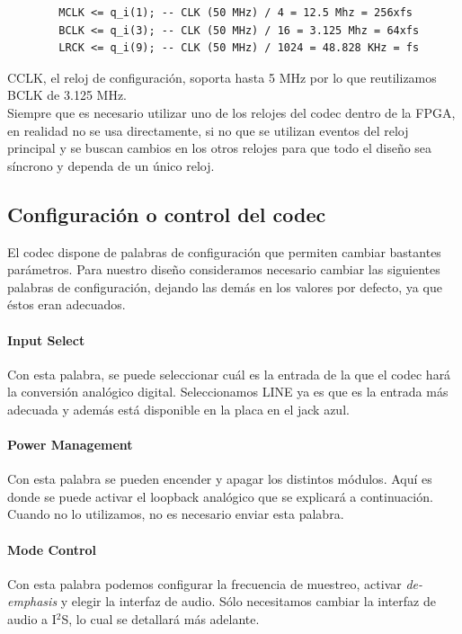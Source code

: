 		\begin{verbatim}
		MCLK <= q_i(1); -- CLK (50 MHz) / 4 = 12.5 Mhz = 256xfs
		BCLK <= q_i(3); -- CLK (50 MHz) / 16 = 3.125 Mhz = 64xfs
		LRCK <= q_i(9); -- CLK (50 MHz) / 1024 = 48.828 KHz = fs
		\end{verbatim} 

CCLK, el reloj de configuración, soporta hasta 5 MHz por lo que reutilizamos BCLK de 3.125 MHz.\\

		Siempre que es necesario utilizar uno de los relojes del codec dentro de la FPGA, en realidad no se usa directamente, si no que se utilizan eventos del reloj principal y se buscan cambios en los otros relojes para que todo el diseño sea síncrono y dependa de un único reloj.






	\subsection{Configuración o control del codec}

		El codec dispone de palabras de configuración que permiten cambiar bastantes parámetros. Para nuestro diseño consideramos necesario cambiar las siguientes palabras de configuración, dejando las demás en los valores por defecto, ya que éstos eran adecuados.\\

		\paragraph{Input Select} 
		Con esta palabra, se puede seleccionar cuál es la entrada de la que el codec hará la conversión analógico digital. Seleccionamos LINE ya es que es la entrada más adecuada y además está disponible en la placa en el jack azul.\\

		\paragraph{Power Management} 
		Con esta palabra se pueden encender y apagar los distintos módulos. Aquí es donde se puede activar el loopback analógico que se explicará a continuación. Cuando no lo utilizamos, no es necesario enviar esta palabra.\\

		\paragraph{Mode Control} 
		Con esta palabra podemos configurar la frecuencia de muestreo, activar \emph{de-emphasis} y elegir la interfaz de audio. Sólo necesitamos cambiar la interfaz de audio a I$^2$S, lo cual se detallará más adelante.\\


